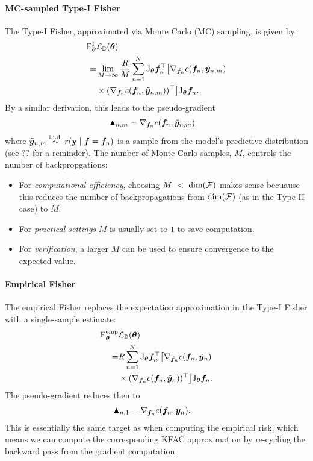 \paragraph{MC-sampled Type-I Fisher}
The Type-I Fisher, approximated via Monte Carlo (MC) sampling, is given by:
\begin{align*}
\mathrm{F}^{\text{I}}_{{\bm{\theta}}} &{\mathcal{L}}_{{\mathbb{D}}}({\bm{\theta}}) \\
=& \lim_{M \to \infty}
  \frac{R}{M} \sum_{n=1}^N
  \mathrm{J}_{{\bm{\theta}}} {\bm{f}}_n^{\top}
  \big[
  \nabla_{{\bm{f}}_n} c({\bm{f}}_n, \tilde{{\bm{y}}}_{n,m}) \\
& \times (\nabla_{{\bm{f}}_n} c({\bm{f}}_n, \tilde{{\bm{y}}}_{n,m}))^{\top}
\big]
\mathrm{J}_{{\bm{\theta}}} {\bm{f}}_n.
\end{align*}
By a similar derivation, this leads to the pseudo-gradient
\begin{align*}
  \blacktriangle_{n,m}
  &= \nabla_{{\bm{f}}_n}  c({\bm{f}}_n, \tilde{{\bm{y}}}_{n,m})
\end{align*}
where $\tilde{{\bm{y}}}_{n,m} \stackrel{\text{i.i.d.}}{\sim} r({\mathbf{y}} \mid {\bm{f}} = {\bm{f}}_n)$ is a sample from the model's predictive distribution (see ?? for a reminder).
The number of Monte Carlo samples, $M$, controls the number of backpropgations:
\begin{itemize}
 \item For \emph{computational efficiency}, choosing $M~<~\dim({\mathcal{F}})$ makes sense becuause this reduces the number of backpropagations from $\dim({\mathcal{F}})$ (as in the Type-II case) to $M$.
 \item For \emph{practical settings} $M$ is usually set to $1$ to save computation.
 \item For \emph{verification}, a larger $M$ can be used to ensure convergence to the expected value.
\end{itemize}

\paragraph{Empirical Fisher}
The empirical Fisher replaces the expectation approximation in the Type-I Fisher with a single-sample estimate:
\begin{align*}
  \mathrm{F}_{\bm{\theta}}^{\text{emp}} &{\mathcal{L}}_{{\mathbb{D}}}({\bm{\theta}}) \\
  =&R \sum_{n=1}^N
      \mathrm{J}_{{\bm{\theta}}} {\bm{f}}_n^{\top}
      \big[
      \nabla_{{\bm{f}}_n} c({\bm{f}}_n, \tilde{{\bm{y}}}_{n}) \\
  &\times (\nabla_{{\bm{f}}_n} c({\bm{f}}_n, \tilde{{\bm{y}}}_{n}))^{\top}
    \big] \mathrm{J}_{{\bm{\theta}}} {\bm{f}}_n.
\end{align*}
The pseudo-gradient reduces then to
\begin{align*}
  \blacktriangle_{n,1}
  &= \nabla_{{\bm{f}}_n}  c({\bm{f}}_n, {\bm{y}}_n).
\end{align*}
This is essentially the same target as when computing the empirical risk, which means we can compute the corresponding KFAC approximation by re-cycling the backward pass from the gradient computation.

